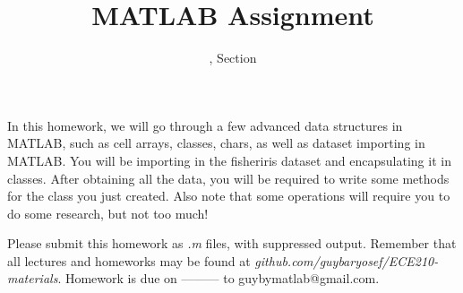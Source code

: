 \documentclass[11pt]{article}
\title{MATLAB Assignment \Homework}
\author{\Session, Section \Section}
\date{}
\makeatletter
\def\MyEmail{guybymatlab@gmail.com}
\def\DateOfSubmission{ --------- }
\makeatother
\begin{document}
\maketitle
In this homework, we will go through a few advanced data structures in MATLAB,
such as cell arrays, classes, chars, as well as dataset importing in MATLAB.
You will be importing in the fisheriris dataset and encapsulating it in classes.
After obtaining all the data, you will be required to write some methods for
the class you just created.
Also note that some operations will require you to do some research, but not too much!

Please submit this homework as \textit{.m} files, 
with suppressed output.
Remember that all lectures and homeworks may be found at 
\textit{github.com/guybaryosef/ECE210-materials}.
Homework is due on \DateOfSubmission to \MyEmail.
\end{document}
